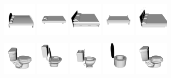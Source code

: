\begin{figure}[!t]
	\includegraphics[width=0.15\textwidth]{Figures/ObjRecog/bed_0}\hfill
	\includegraphics[width=0.15\textwidth]{Figures/ObjRecog/bed_1}\hfill
	\includegraphics[width=0.15\textwidth]{Figures/ObjRecog/bed_2}\hfill
	\includegraphics[width=0.15\textwidth]{Figures/ObjRecog/bed_3}\hfill
	\includegraphics[width=0.15\textwidth]{Figures/ObjRecog/bed_4}\hfill

	\includegraphics[width=0.15\textwidth]{Figures/ObjRecog/toilet_0}\hfill
	\includegraphics[width=0.15\textwidth]{Figures/ObjRecog/toilet_1}\hfill
	\includegraphics[width=0.15\textwidth]{Figures/ObjRecog/toilet_2}\hfill
	\includegraphics[width=0.15\textwidth]{Figures/ObjRecog/toilet_3}\hfill
	\includegraphics[width=0.15\textwidth]{Figures/ObjRecog/toilet_4}\hfill


\end{figure}
